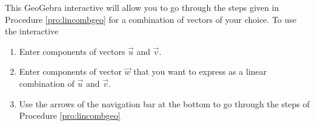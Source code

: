 \documentclass{ximera}
\begin{document}
\begin{exploration}\label{exp:proc4}
This GeoGebra interactive will allow you to go through the steps given in Procedure \ref{pro:lincombgeo} for a combination of vectors of your choice.  To use the interactive
\begin{enumerate}
    \item Enter components of vectors $\vec{u}$ and $\vec{v}$.
    \item Enter components of vector $\vec{w}$ that you want to express as a linear combination of $\vec{u}$ and $\vec{v}$.
    \item Use the arrows of the navigation bar at the bottom to go through the steps of Procedure \ref{pro:lincombgeo}
\end{enumerate}

\begin{center} 
\end{center}
\end{exploration}
\end{document}
